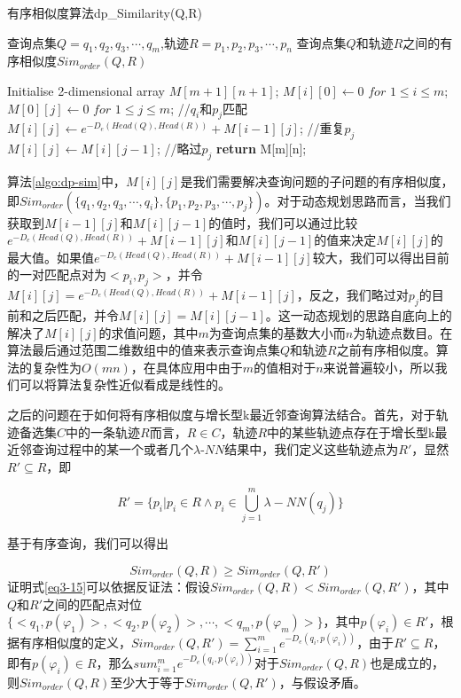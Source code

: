 \begin{algorithm}
\caption{有序相似度算法dp\_Similarity(Q,R)}
\label{algo:dp-sim}
\begin{algorithmic}[1] %
\Require 查询点集$Q={q_1,q_2,q_3,\cdots,q_m}$,轨迹$R={p_1,p_2,p_3,\cdots,p_n}$
\Ensure 查询点集$Q$和轨迹$R$之间的有序相似度$Sim_{order}(Q,R)$

\State Initialise 2-dimensional array $M[m+1][n+1]$;
\State $M[i][0] \gets 0$ $for$ $1\leq i\leq m$;
\State $M[0][j] \gets 0$ $for$ $1\leq j\leq m$;
		//$q_i$和$p_j$匹配
		\State $M[i][j] \gets e^{-D_{e}(Head(Q),Head(R))} + M[i-1][j]$; //重复$p_j$
		\Else 
		\State $M[i][j] \gets M[i][j-1]$; //略过$p_j$
		\EndIf
	\EndFor
	\State \textbf{return} M[m][n];
\EndFor
\end{algorithmic}
\end{algorithm}
算法\ref{algo:dp-sim}中，$M[i][j]$是我们需要解决查询问题的子问题的有序相似度，即$Sim_{order}(\{q_1,q_2,q_3,\cdots,q_i\}, \{p_1,p_2,p_3,\cdots,p_j\})$。对于动态规划思路而言，当我们获取到$M[i-1][j]$和$M[i][j-1]$的值时，我们可以通过比较$e^{-D_{e}(Head(Q),Head(R))} + M[i-1][j]$和$M[i][j-1]$的值来决定$M[i][j]$的最大值。如果值$e^{-D_{e}(Head(Q),Head(R))} + M[i-1][j]$较大，我们可以得出目前的一对匹配点对为$<p_i, p_j>$，并令$M[i][j] = e^{-D_{e}(Head(Q),Head(R))} + M[i-1][j]$，反之，我们略过对$p_j$的目前和之后匹配，并令$M[i][j]=M[i][j-1]$。这一动态规划的思路自底向上的解决了$M[i][j]$的求值问题，其中$m$为查询点集的基数大小而$n$为轨迹点数目。在算法最后通过范围二维数组中的值来表示查询点集$Q$和轨迹$R$之前有序相似度。算法的复杂性为$O(mn)$，在具体应用中由于$m$的值相对于$n$来说普遍较小，所以我们可以将算法复杂性近似看成是线性的。

之后的问题在于如何将有序相似度与增长型k最近邻查询算法结合。首先，对于轨迹备选集$C$中的一条轨迹$R$而言，$R\in C$，轨迹$R$中的某些轨迹点存在于增长型k最近邻查询过程中的某一个或者几个$\lambda$-$NN$结果中，我们定义这些轨迹点为$R'$，显然$R' \subseteq R$，即

\begin{displaymath}
R' = \{p_i | p_i \in R \wedge p_i \in\bigcup_{j=1}^{m}\lambda -NN(q_j)\}
\end{displaymath}

基于有序查询，我们可以得出

\begin{equation}
\label{eq3-15}
Sim_{order}(Q, R) \geq Sim_{order}(Q, R')
\end{equation}
证明式\ref{eq3-15}可以依据反证法：假设$Sim_{order}(Q, R) < Sim_{order}(Q, R')$，其中$Q$和$R'$之间的匹配点对位$\{<q_1, p(\varphi_1)>,<q_2, p(\varphi_2)>,\cdots,<q_m, p(\varphi_m)>\}$，其中$p(\varphi_i) \in R'$，根据有序相似度的定义，$Sim_{order}(Q,R')=\sum_{i=1}^{m}e^{-D_{e}(q_i, p(\varphi_i))}$，由于$R' \subseteq R$，即有$p(\varphi_i) \in R$，那么$sum_{i=1}^{m}e^{-D_{e}(q_i, p(\varphi_i))}$对于$Sim_{order}(Q,R)$也是成立的，则$Sim_{order}(Q,R)$至少大于等于$Sim_{order}(Q,R')$，与假设矛盾。

